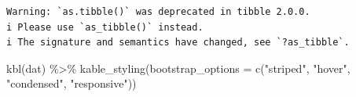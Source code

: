 \documentclass[
  letterpaper,
  DIV=11,
  numbers=noendperiod]{scrartcl}
\newenvironment{Shaded}{\begin{snugshade}}{\end{snugshade}}
\newcommand{\AttributeTok}[1]{\textcolor[rgb]{0.40,0.45,0.13}{#1}}
\newcommand{\FunctionTok}[1]{\textcolor[rgb]{0.28,0.35,0.67}{#1}}
\newcommand{\NormalTok}[1]{\textcolor[rgb]{0.00,0.23,0.31}{#1}}
\newcommand{\SpecialCharTok}[1]{\textcolor[rgb]{0.37,0.37,0.37}{#1}}
\newcommand{\StringTok}[1]{\textcolor[rgb]{0.13,0.47,0.30}{#1}}
\begin{document}
\begin{verbatim}
Warning: `as.tibble()` was deprecated in tibble 2.0.0.
i Please use `as_tibble()` instead.
i The signature and semantics have changed, see `?as_tibble`.
\end{verbatim}

\begin{Shaded}
\begin{Highlighting}[]
\FunctionTok{kbl}\NormalTok{(dat) }\SpecialCharTok{\%\textgreater{}\%}
  \FunctionTok{kable\_styling}\NormalTok{(}\AttributeTok{bootstrap\_options =} \FunctionTok{c}\NormalTok{(}\StringTok{"striped"}\NormalTok{, }\StringTok{"hover"}\NormalTok{, }\StringTok{"condensed"}\NormalTok{, }\StringTok{"responsive"}\NormalTok{))}
\end{Highlighting}
\end{Shaded}
\end{document}
